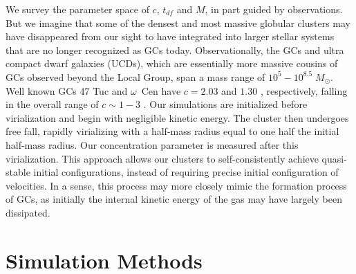 \documentclass{princeton_astro_thesis}
\newcommand\msun{\; M_\odot}
\numberwithin{equation}{section}
\begin{document}
We survey the parameter space of $c$, $t_{df}$ and $M$, in part guided by observations.
But we imagine that some of the densest and most massive globular clusters may have disappeared from 
our sight to have integrated into larger stellar systems that are no longer recognized as GCs today.
Observationally, the GCs and ultra compact dwarf galaxies (UCDs), which are essentially more massive cousins
of GCs observed beyond the Local Group, span a mass range of $10^5-10^{8.5}\msun$.  
Well known GCs 47 Tuc and $\omega$~Cen have $c=2.03$ and $1.30$ \citep[][]{2000Carraro}, respectively,
falling in the overall range of $c\sim 1-3$ \citep[e.g.,][]{2007Evstigneeva}.
Our simulations are initialized before virialization and begin with negligible kinetic energy. The cluster then undergoes free fall, rapidly virializing with a half-mass radius equal to one half the initial half-mass radius.  Our concentration parameter is measured after this virialization. This approach allows our clusters to self-consistently achieve quasi-stable initial configurations, instead of requiring precise initial configuration of velocities. In a sense, this process may more closely mimic the formation process of GCs, as initially the internal kinetic energy of the gas may have largely been dissipated.


\chapter{Simulation Methods} \label{ch:Methods}
\end{document}
